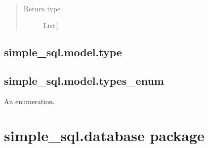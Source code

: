 \documentclass[letterpaper,10pt,english]{sphinxmanual}
\begin{document}
\begin{fulllineitems}
\begin{fulllineitems}
\begin{quote}
\begin{description}
\item[{Return type}] \leavevmode
\sphinxAtStartPar
List{[}{\hyperref[\detokenize{model:simple_sql.model.foreign_key.ForeignKey}]{}}{]}

\end{description}\end{quote}

\end{fulllineitems}


\end{fulllineitems}



\section{simple\_sql.model.type}
\label{\detokenize{model:simple-sql-model-type}}

\begin{fulllineitems}
\label{\detokenize{model:simple_sql.model.type.Type}}
\end{fulllineitems}



\section{simple\_sql.model.types\_enum}
\label{\detokenize{model:simple-sql-model-types-enum}}

\begin{fulllineitems}
\label{\detokenize{model:simple_sql.model.types_enum.TypesEnum}}
\sphinxAtStartPar
An enumeration.

\end{fulllineitems}



\chapter{simple\_sql.database package}
\label{\detokenize{database:simple-sql-database-package}}\label{\detokenize{database::doc}}
\end{document}
